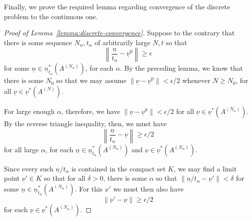 \documentclass{article} %
\newcommand{\ul}[1]{\underline{#1}}
\begin{document}
Finally, we prove the required lemma regarding convergence of the discrete problem to the continuous one.
\begin{proof}[Proof of Lemma~\ref{lemma:discrete-convergence}]
    Suppose to the contrary that there is some sequence $N_{\alpha},t_{\alpha}$ of arbitrarily large $N,t$ so that
    \[
    \left\| \frac{\ul{n}}{t_\alpha}-\ul{\nu}^0 \right\| \geq \epsilon
    \]
    for some $\ul{n}\in \ul{n}^*_{t_\alpha}(A^{(N_\alpha)})$, for each $\alpha$. By the preceding lemma, we know that there is some $N_0$ so that we may assume $\|\ul{\nu}-\ul{\nu}^0\|<\epsilon/2$ whenever $N\geq N_0$, for all $\ul{\nu}\in\ul{\nu}^*(A^{(N)})$.

    For large enough $\alpha$, therefore, we have $\|\ul{\nu}-\ul{\nu}^0\|<\epsilon/2$ for all $\ul{\nu}\in\ul{\nu}^*(A^{(N_\alpha)})$. By the reverse triangle inequality, then, we must have
    \[
    \left\| \frac{\ul{n}}{t_\alpha}-\ul{\nu} \right\| \geq \epsilon/2
    \]
    for all large $\alpha$, for each $\ul{n}\in \ul{n}_{t_\alpha}^*(A^{(N_\alpha)})$ and $\ul{\nu}\in \ul{\nu}^*(A^{(N_\alpha)})$.

    Since every such $\ul{n}/t_\alpha$ is contained in the compact set $K$, we may find a limit point $\ul{\nu}'\in K$ so that for all $\delta>0$, there is some $\alpha$ so that $\|\ul{n}/t_\alpha-\ul{\nu}'\|<\delta$ for some $\ul{n}\in\ul{n}^*_{t_\alpha}(A^{(N_\alpha)})$. For this $x'$ we must then also have
    \[
    \|\ul{\nu}'-\ul{\nu}\|\geq\epsilon/2
    \]
    for each $\ul{\nu}\in\ul{\nu}^*(A^{(N_\alpha)})$. 


\end{proof}
\end{document}
